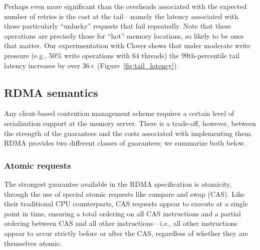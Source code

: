Perhaps even more significant than the overheads associated with the
expected number of retries is the cost at the tail---namely the
latency associated with those particularly ``unlucky'' requests that
fail repeatedly.  Note that these operations are precisely those for
``hot'' memory locations, so likely to be ones that matter.  Our
experimentation with Clover shows that under moderate write pressure
(e.g., 50\% write operations with 64 threads) the 99th-percentile tail
latency increases by over 36$\times$ (Figure~\ref{fig:tail_latency}).



\subsection{RDMA semantics}

Any client-based contention management scheme requires a certain level
of serialization support at the memory server.  There is a trade-off,
however, between the strength of the guarantees and the costs
associated with implementing them.  RDMA provides two different
classes of guarantees; we summarize both below.

\subsubsection{Atomic requests}

The strongest guarantee available in the RDMA specification is
atomicity, through the use of special atomic requests like compare
and swap (CAS).  Like their traditional CPU counterparts, CAS
requests appear to execute at a single point in time, ensuring a
total ordering on all CAS instructions and a partial ordering between
CAS and all other instructions---i.e., all other instructions appear
to occur strictly before or after the CAS, regardless of whether they
are themselves atomic.

